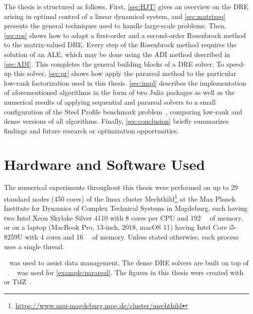 The thesis is structured as follows.
First, \autoref{sec:HJT} gives an overview on the \ac{DRE} arising in optimal control of a linear dynamical system,
and \autoref{sec:matrixeq} presents the general techniques used to handle large-scale problems.
Then, \autoref{sec:ros} shows how to adapt a first-order and a second-order Rosenbrock method to the matrix-valued \ac{DRE}.
Every step of the Rosenbrock method requires the solution of an \ac{ALE},
which may be done using \eg the \ac{ADI} method described in \autoref{sec:ADI}.
This completes the general building blocks of a \ac{DRE} solver.
To speed-up this solver,
\autoref{sec:pr} shows how apply the parareal method to the particular low-rank factorization used in this thesis.
\autoref{sec:impl} describes the implementation of aforementioned algorithms in the form of two Julia packages
as well as the numerical results of applying sequential and parareal solvers to
a small configuration of the Steel Profile benchmark problem~\cite{morwiki_steel},
comparing low-rank and dense versions of all algorithms.
Finally, \autoref{sec:conclusion} briefly summarizes findings and future research or optimization opportunities.

\section*{Hardware and Software Used}

The numerical experiments throughout this thesis were performed
on up to 29 standard nodes (450 cores) of the linux cluster Mechthild\footnote{\url{https://www.mpi-magdeburg.mpg.de/cluster/mechthild}}
at the Max Planck Institute for Dynamics of Complex Technical Systems in Magdeburg,
each having
two Intel Xeon Skylake Silver 4110 with 8 cores per CPU
and \SI{192}{\giga\byte} of memory,
or on a laptop (MacBook Pro, 13-inch, 2018, macOS 11) having
Intel Core i5-8259U with 4 cores and \SI{16}{\giga\byte} of memory.
Unless stated otherwise, each process uses a single thread.

~\cite{DrWatson} was used to assist data management.
The dense \ac{DRE} solvers are built on top of ~\cite{MatrixEquations}.
~\cite{DifferentialEquations} was used for \autoref{example:parareal}.
The figures in this thesis were created with
~\cite{Makie} or Ti\emph{k}Z~\cite{TikZ}.
